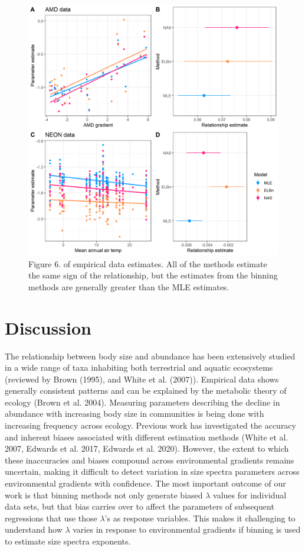 \documentclass[
]{article}
\begin{document}
\newpage

\begin{figure}
\centering
\includegraphics{figures/empirical_combined.png}
\caption{Figure 6. of empirical data estimates. All of the methods
estimate the same sign of the relationship, but the estimates from the
binning methods are generally greater than the MLE estimates.}
\end{figure}

\newpage

\hypertarget{discussion}{%
\section{Discussion}\label{discussion}}

The relationship between body size and abundance has been extensively
studied in a wide range of taxa inhabiting both terrestrial and aquatic
ecosystems (reviewed by Brown (1995), and White et al. (2007)).
Empirical data shows generally consistent patterns and can be explained
by the metabolic theory of ecology (Brown et al. 2004). Measuring
parameters describing the decline in abundance with increasing body size
in communities is being done with increasing frequency across ecology.
Previous work has investigated the accuracy and inherent biases
associated with different estimation methods (White et al. 2007, Edwards
et al. 2017, Edwards et al. 2020). However, the extent to which these
inaccuracies and biases compound across environmental gradients remains
uncertain, making it difficult to detect variation in size spectra
parameters across environmental gradients with confidence. The most
important outcome of our work is that binning methods not only generate
biased \(\lambda\) values for individual data sets, but that bias
carries over to affect the parameters of subsequent regressions that use
those \(\lambda\)'s as response variables. This makes it challenging to
understand how \(\lambda\) varies in response to environmental gradients
if binning is used to estimate size spectra exponents.
\end{document}
